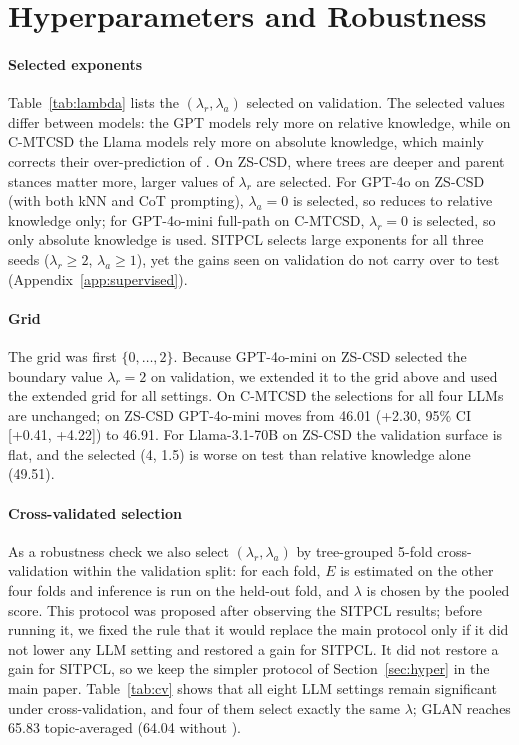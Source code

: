 \section{Hyperparameters and Robustness}
\label{app:hyper}

\paragraph{Selected exponents}
Table~\ref{tab:lambda} lists the $(\lambda_r,\lambda_a)$ selected on validation. The selected values differ between models: the GPT models rely more on relative knowledge, while on C-MTCSD the Llama models rely more on absolute knowledge, which mainly corrects their over-prediction of \nonelabel{}. On ZS-CSD, where trees are deeper and parent stances matter more, larger values of $\lambda_r$ are selected. For GPT-4o on ZS-CSD (with both kNN and CoT prompting), $\lambda_a = 0$ is selected, so \spin{} reduces to relative knowledge only; for GPT-4o-mini full-path on C-MTCSD, $\lambda_r = 0$ is selected, so only absolute knowledge is used. SITPCL selects large exponents for all three seeds ($\lambda_r \geq 2$, $\lambda_a \geq 1$), yet the gains seen on validation do not carry over to test (Appendix~\ref{app:supervised}).

\paragraph{Grid}
The grid was first $\{0,\ldots,2\}$. Because GPT-4o-mini on ZS-CSD selected the boundary value $\lambda_r = 2$ on validation, we extended it to the grid above and used the extended grid for all settings. On C-MTCSD the selections for all four LLMs are unchanged; on ZS-CSD GPT-4o-mini moves from 46.01 (+2.30, 95\% CI [+0.41, +4.22]) to 46.91. For Llama-3.1-70B on ZS-CSD the validation surface is flat, and the selected (4, 1.5) is worse on test than relative knowledge alone (49.51).

\paragraph{Cross-validated selection}
As a robustness check we also select $(\lambda_r,\lambda_a)$ by tree-grouped 5-fold cross-validation within the validation split: for each fold, $E$ is estimated on the other four folds and inference is run on the held-out fold, and $\lambda$ is chosen by the pooled score. This protocol was proposed after observing the SITPCL results; before running it, we fixed the rule that it would replace the main protocol only if it did not lower any LLM setting and restored a gain for SITPCL. It did not restore a gain for SITPCL, so we keep the simpler protocol of Section~\ref{sec:hyper} in the main paper. Table~\ref{tab:cv} shows that all eight LLM settings remain significant under cross-validation, and four of them select exactly the same $\lambda$; GLAN reaches 65.83 topic-averaged \favg{} (64.04 without \spin{}).

